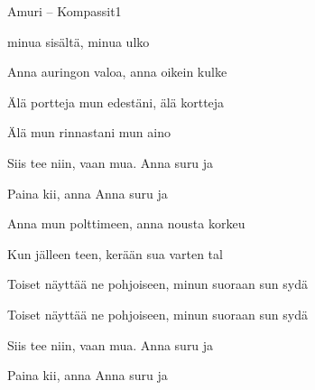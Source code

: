 \documentclass[12pt,a4paper]{article}
\begin{document}
\thispagestyle{empty}
\begin{mysong}{Amuri – Kompassit}{1}

\begin{SBVerse}
   minua sisältä,  minua ulko

  Anna  auringon valoa, anna  oikein kulke

  Älä  portteja mun edestäni, älä  kortteja

  Älä  mun rinnastani mun  aino
\end{SBVerse}

\begin{SBChorus}
  Siis  tee niin, vaan  mua.  Anna 
  suru ja 

  Paina  kii, anna  Anna 
  suru ja 
\end{SBChorus}

\begin{SBVerse}
  Anna  mun polttimeen, anna  nousta
  korkeu

  Kun  jälleen teen,  kerään sua varten
  tal

  Toiset  näyttää ne pohjoiseen, minun 
  suoraan sun sydä

  Toiset  näyttää ne pohjoiseen, minun 
  suoraan sun sydä
\end{SBVerse}

\begin{SBChorus}
  Siis  tee niin, vaan  mua.  Anna 
  suru ja 

  Paina  kii, anna  Anna 
  suru ja 
\end{SBChorus}

\end{mysong}
\end{document}
